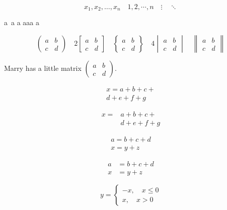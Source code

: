 \documentclass{article}
\begin{document}
\[ x_1,x_2,\dots,x_n\quad 1,2,\cdots,n\quad
\vdots\quad \ddots \]

a\, a\: a\; a\quad a\qquad a\! a

\[ \begin{pmatrix} a&b\\c&d \end{pmatrix} \quad
2 \begin{bmatrix} a&b\\c&d \end{bmatrix} \quad
\begin{Bmatrix} a&b\\c&d \end{Bmatrix} \quad
4 \begin{vmatrix} a&b\\c&d \end{vmatrix} \quad
\begin{Vmatrix} a&b\\c&d \end{Vmatrix} \]

Marry has a little matrix $ ( \begin{smallmatrix}
    a&b\\c&d \end{smallmatrix} ) $.

\begin{multline}
    x = a+b+c+ \\
    d+e+f+g
\end{multline}

\[ \begin{split}
    x = &a+b+c+ \\
    &d+e+f+g
\end{split} \]

\begin{gather}
    a = b+c+d \\
    x = y+z
\end{gather}

\begin{align}
    a &= b+c+d \\
    x &= y+z
\end{align}

\[ 
y=
\begin{cases}
    -x,\quad x\leq 0 \\
    x,\quad x>0
\end{cases} 
\]
\end{document}
